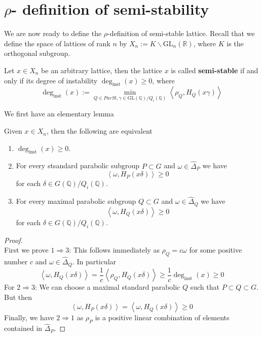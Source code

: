 \section{$\rho$- definition of semi-stability}
We are now ready to define the $\rho$-definition of semi-stable lattice. Recall that
we define the space of lattices of rank $n$ by $X_n := K \backslash \text{GL}_n(\mathbb{R})$, where $K$ is the orthogonal subgroup.
\begin{definition}[\label  = $\rho$-definition]\label{ss2}
    Let $x \in X_n$ be an arbitrary lattice, then the lattice $x$ is called \textbf{semi-stable} if and only if its degree of instability $\deg_{\text{inst}}(x)\ge 0$, where
    \[\deg_{\text{inst}}(x):= \min_{Q \in ParSt, \gamma \in \text{GL}(\mathbb{Q})/Q_i(\mathbb{Q})}\left\langle \rho_Q, H_Q(x\gamma) \right\rangle\]
\end{definition}
We first have an elementary lemma
\begin{lemma}\label{ss-equiv}
    Given $x \in X_n$, then the following are equivalent
    \begin{enumerate}
        \item $\deg_{\text{inst}}(x) \ge 0$.
        \item For every stsandard parabolic subgroup $P\subset G$ and $\omega \in \widehat{\Delta}_P$ we have \[\left\langle \omega,H_P(x\delta)\right\rangle \ge 0\] for each $\delta \in G(\mathbb{Q})/Q_i(\mathbb{Q})$.
        \item For every maximal parabolic subgroup $Q\subset G$ and $\omega \in \widehat{\Delta}_Q$ we have \[\left\langle \omega,H_Q(x\delta)\right\rangle \ge 0\] for each $\delta \in G(\mathbb{Q})/Q_i(\mathbb{Q})$.
    \end{enumerate}
\end{lemma}
\begin{proof}
    \hfill\\
    First we prove $1 \Rightarrow 3$: This follows immediately as $\rho_Q = c\omega$ for some positive number $c$ and $\omega \in \widehat{\Delta}_Q$. In particular
    \[\left\langle \omega,H_Q(x\delta) \right\rangle = \dfrac{1}{c}\left\langle \rho_Q,H_Q(x\delta) \right\rangle \ge \dfrac{1}{c}\deg_{\text{inst}}(x) \ge 0\]
    For $2 \Rightarrow 3$: We can choose a maximal standard parabolic $Q$ such that 
    $P \subset Q \subset G$. But then 
    \[\left\langle \omega,H_P(x\delta) \right\rangle =\left\langle \omega,H_Q(x\delta) \right\rangle \ge 0\]
    Finally, we have $2 \Rightarrow 1$ as $\rho_P$ is a positive linear combination of elements contained in $\widehat{\Delta}_P$.
\end{proof}
